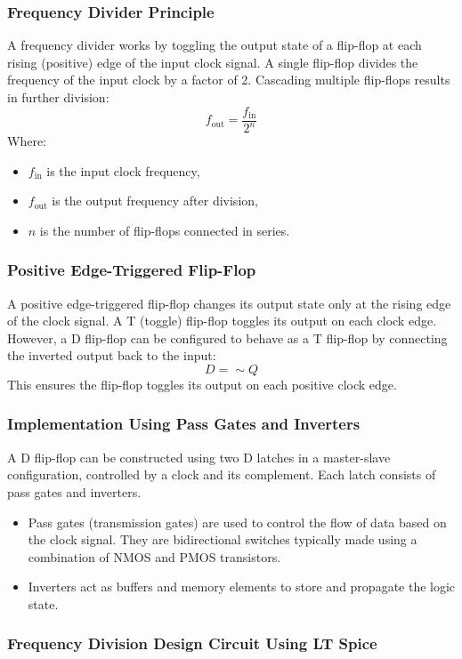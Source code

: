 \subsubsection*{Frequency Divider Principle}
A frequency divider works by toggling the output state of a flip-flop at each rising (positive) edge of the input clock signal. A single flip-flop divides the frequency of the input clock by a factor of 2. Cascading multiple flip-flops results in further division:
\begin{equation}
	\label{eq:freq_div}
	f_{\text{out}} = \frac{f_{\text{in}}}{2^n}
\end{equation}
Where:
\begin{itemize}
    \item $f_{\text{in}}$ is the input clock frequency,
    \item $f_{\text{out}}$ is the output frequency after division,
    \item $n$ is the number of flip-flops connected in series.
\end{itemize}
\subsubsection*{Positive Edge-Triggered Flip-Flop}
A positive edge-triggered flip-flop changes its output state only at the rising edge of the clock signal. A T (toggle) flip-flop toggles its output on each clock edge. However, a D flip-flop can be configured to behave as a T flip-flop by connecting the inverted output back to the input:
\[
D = \sim Q
\]
This ensures the flip-flop toggles its output on each positive clock edge.
\subsubsection*{Implementation Using Pass Gates and Inverters}
A D flip-flop can be constructed using two D latches in a master-slave configuration, controlled by a clock and its complement. Each latch consists of pass gates and inverters.
\begin{itemize}
    \item Pass gates (transmission gates) are used to control the flow of data based on the clock signal. They are bidirectional switches typically made using a combination of NMOS and PMOS transistors.
    \item Inverters act as buffers and memory elements to store and propagate the logic state.
\end{itemize}
\subsubsection*{Frequency Division Design Circuit Using LT Spice}

